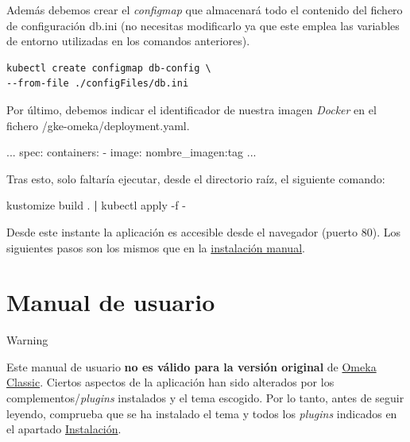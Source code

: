 \documentclass[
]{article}
\newenvironment{Shaded}{}{}
\newcommand{\ExtensionTok}[1]{#1}
\newcommand{\KeywordTok}[1]{\textcolor[rgb]{0.00,0.44,0.13}{\textbf{#1}}}
\newcommand{\NormalTok}[1]{#1}
\begin{document}
Además debemos crear el \emph{configmap} que almacenará todo el
contenido del fichero de configuración {db.ini} (no necesitas
modificarlo ya que este emplea las variables de entorno utilizadas en
los comandos anteriores).

\begin{verbatim}
kubectl create configmap db-config \
--from-file ./configFiles/db.ini
\end{verbatim}

Por último, debemos indicar el identificador de nuestra imagen
\emph{Docker} en el fichero {/gke-omeka/deployment.yaml}.

\begin{Shaded}
\begin{Highlighting}[]
\ExtensionTok{...}
    \ExtensionTok{spec}\NormalTok{:}
      \ExtensionTok{containers}\NormalTok{:}
      \ExtensionTok{{-}}\NormalTok{ image: nombre\_imagen:tag}
\ExtensionTok{...}
\end{Highlighting}
\end{Shaded}

Tras esto, solo faltaría ejecutar, desde el directorio raíz, el
siguiente comando:

\begin{Shaded}
\begin{Highlighting}[]
\ExtensionTok{kustomize}\NormalTok{ build . }\KeywordTok{|} \ExtensionTok{kubectl}\NormalTok{ apply {-}f {-}}
\end{Highlighting}
\end{Shaded}

Desde este instante la aplicación es accesible desde el navegador
(puerto 80). Los siguientes pasos son los mismos que en la
\href{Manual}{instalación manual}.

\hypertarget{manual-de-usuario}{%
\section{Manual de usuario}\label{manual-de-usuario}}

Warning

Este manual de usuario \textbf{no es válido para la versión original} de
\href{https://omeka.org/classic}{Omeka Classic}. Ciertos aspectos de la
aplicación han sido alterados por los complementos/\emph{plugins}
instalados y el tema escogido. Por lo tanto, antes de seguir leyendo,
comprueba que se ha instalado el tema y todos los \emph{plugins}
indicados en el apartado
\protect\hyperlink{instalaciuxf3n}{Instalación}.
\end{document}

